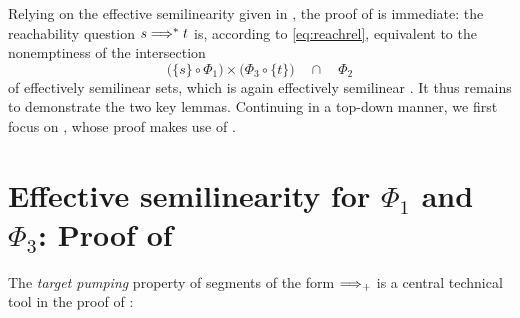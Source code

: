 Relying on the effective 
semilinearity given in ,
the proof of  is immediate:
the reachability question $s\Longrightarrow^* t$
is, according to \eqref{eq:reachrel}, equivalent to
the nonemptiness of the intersection
\[ \bigl(\{s\} \circ \Phi_1\bigr) \times 
\bigl(\Phi_3\circ \{t\} \bigr)
\quad \cap \quad
\Phi_2
\]
of effectively semilinear sets,
which is again effectively semilinear \cite[Thm.~6]{taming}.
It thus remains to demonstrate the two key lemmas.
Continuing in a top-down manner, we first focus on
, whose proof makes use of
.






\section{Effective semilinearity for $\Phi_1$ and $\Phi_3$: 
Proof of } \label{sec:sl}



The \emph{target pumping} 
property of segments of the form $\Longrightarrow_{+}$ is 
a central technical tool in the proof of
:

